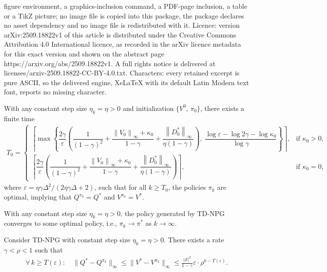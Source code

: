 \documentclass[10pt,a4paper]{amsart}
\newcommand{\calS}{\mathcal{S}}
\newcommand{\ls}{\left}
\newcommand{\rs}{\right}
\begin{document}
figure environment, a graphics-inclusion command, a PDF-page inclusion, a table or a TikZ picture; no image file is copied into this package, the package declares no asset dependency and no image file is redistributed with it. Licence: version arXiv:2509.18822v1 of this article is distributed under the Creative Commons Attribution 4.0 International licence, as recorded in the arXiv licence metadata for this exact version and shown on the abstract page https://arxiv.org/abs/2509.18822v1. A full rights notice is delivered at licenses/arxiv-2509.18822-CC-BY-4.0.txt. Characters: every retained excerpt is pure ASCII, so the delivered engine, XeLaTeX with its default Latin Modern text font, reports no missing character.
\begin{theorem}
    With any constant step size $\eta_k = \eta > 0$ and initialization $\{ V^0, \, \pi_0 \}$, there exists a finite time 
    \begin{align*}
        T_0 \!=\! \begin{cases}
            \!\ls\lceil \max  \ls\{ \dfrac{2\gamma}{\varepsilon} \!\ls( \dfrac{1}{(1-\gamma)^2}\!+\!\dfrac{\ls\| V_0 \rs\|_\infty \!+\! \kappa_0}{1-\gamma} \!+\! \dfrac{\ls\| D_0^* \rs\|_\infty}{\eta(1-\gamma)} \rs)\!, \; \dfrac{\log\varepsilon \!-\! \log 2\gamma \!-\! \log \kappa_0}{\log \gamma} \rs\} \!\rs\rceil, & \!\mbox{if } \kappa_0 > 0, \\[.7em]
            \!\ls\lceil \dfrac{2\gamma}{\varepsilon} \ls( \dfrac{1}{(1-\gamma)^2}\!+\!\dfrac{\ls\| V_0 \rs\|_\infty \!+\! \kappa_0}{1-\gamma} + \dfrac{\ls\| D_0^* \rs\|_\infty}{\eta(1-\gamma)} \rs) \rs\rceil, & \!\mbox{if } \kappa_0 = 0,
        \end{cases}  
    \end{align*}
    where $\varepsilon=\eta\gamma\Delta^2/(2\eta\gamma\Delta+2)$, such that for all $k\ge T_0$, the policies $\pi_k$ are optimal, implying that $Q^{\pi_k}=Q^*$ and $V^{\pi_k}=V^*$.
    \label{thm:finite-iteration-convergence-of-TD-PQA}
\end{theorem}

\begin{theorem}
    With any constant step size $\eta_k=\eta>0$, the policy generated by TD-NPG converges to some optimal policy, i.e., $\pi_k \to \pi^*$ as $k \to \infty$.
    \label{thm:policy-convergence-of-TD-NPG}
\end{theorem}

\begin{lemma}
    Consider TD-NPG with constant step size $\eta_k = \eta > 0$. There exists a rate $\gamma < \rho < 1$ such that
    \begin{align*}
        \forall\, k\geq T(\varepsilon): \quad \| Q^* - Q^{\pi_k} \|_\infty \leq \| V^* - V^{\pi_k} \|_\infty \leq \frac{|\calS|^2}{1-\gamma} \varepsilon \cdot \rho^{k-T(\varepsilon)}.
    \end{align*}
    \label{lem:local-linear-convergence-of-Q-pi-TD-NPG}
\end{lemma}
\end{document}
